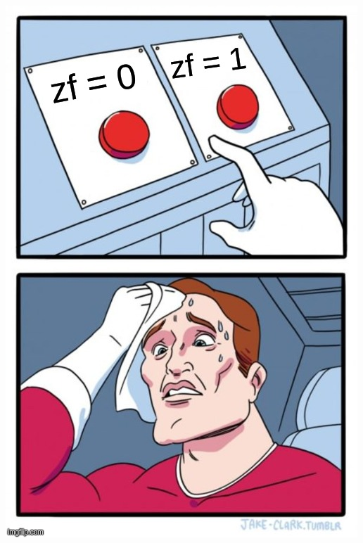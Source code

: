 \documentclass[aspectratio=169]{beamer}
\begin{document}
\begin{frame}
\begin{columns}
\begin{column}{.5\textwidth}
\begin{center}
        \includegraphics[scale=0.25]{zero-flag-meme}
      \end{center}
    \end{column}
  \end{columns}
\end{frame}
\end{document}
